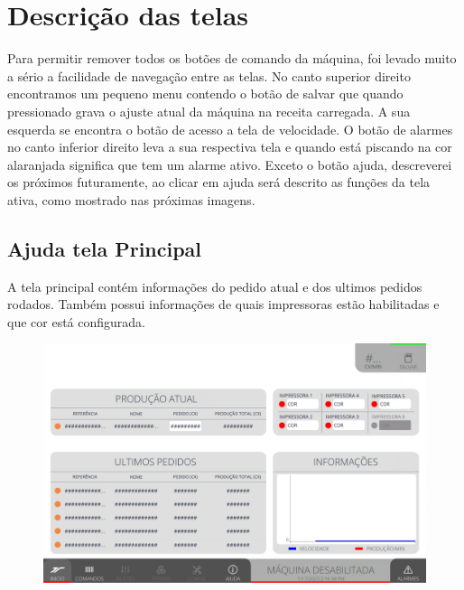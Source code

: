 \thispagestyle{fancy}

\vspace{\fill}

\section{\large{Descrição das telas}}


Para permitir remover todos os botões de comando da máquina, foi levado muito a sério a facilidade de navegação entre as telas.
No canto superior direito encontramos um pequeno menu contendo o botão de salvar que quando pressionado grava o ajuste atual da
máquina na receita carregada. A sua esquerda se encontra o botão de acesso a tela de velocidade.
O botão de alarmes no canto inferior direito leva a sua respectiva tela e quando está piscando na cor alaranjada significa
que tem um alarme ativo. Exceto o botão ajuda, descreverei os próximos futuramente, ao clicar em ajuda será descrito as
funções da tela ativa, como mostrado nas próximas imagens.

\subsection{Ajuda tela Principal}
A tela principal contém informações do pedido atual e dos ultimos pedidos rodados. Também
possui informações de quais impressoras estão habilitadas e que cor está configurada.

\begin{figure}
    \centering
    \includegraphics[width=480 px,height=300 px]{src/imagesICV/01-main/1.png}
\end{figure}

\newpage
\thispagestyle{fancy}
\vspace{\fill}

